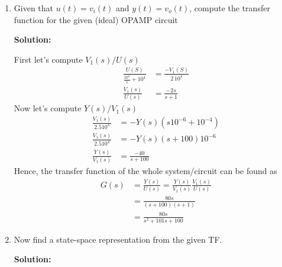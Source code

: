 \documentclass[twoside]{article}
\begin{document}
\begin{enumerate}
  \item Given that $u(t) = v_i(t)$ and $y(t) = v_o(t)$, compute the
    transfer function for the given (ideal) OPAMP circuit

\textbf{Solution:}

First let's compute $V_1(s)/U(s)$ 
%
\begin{align*}
\frac{U(S)}{ \frac{10^4}{s} + 10^4 } &= \frac{-V_1(S)}{ 2 \, 10^4} 
\\
\frac{V_1(s)}{U(s)} &= \frac{-2 s}{s + 1}
\end{align*}
%
Now let's compute $Y(s)/V_1(s)$ 
%
\begin{align*}
\frac{V_1(s)}{ 2.5 10^4} &= -Y(s) \left( s 10^{-6} + 10^{-4} \right)
\\
\frac{V_1(s)}{ 2.5 10^4} &= -Y(s) \left( s + 100 \right) 10^{-6}
\\
\frac{Y(s)}{V_1(s)} &= \frac{-40}{s + 100}
\end{align*}
%
Hence, the transfer function of the whole system/circuit can be found
as
%
\begin{align*}
G(s) &= \frac{Y(s)}{U(s)} = \frac{Y(s)}{V_1(s)} \frac{V_1(s)}{U(s)}
\\
&= \frac{80 s}{(s + 100) (s+1)}
\\
&= \frac{80 s}{s^2 + 101 s + 100}
\end{align*}

\item Now find a state-space representation from the given TF.

\textbf{Solution:}


\end{enumerate}
\end{document}
